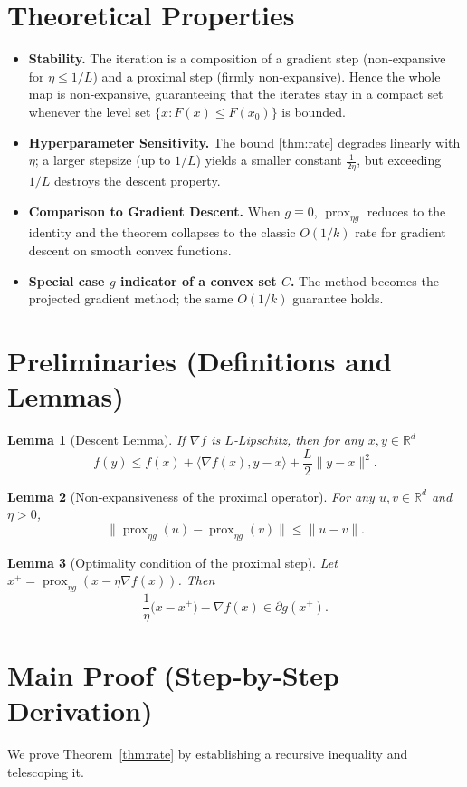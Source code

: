 \documentclass{article}
\newtheorem{lemma}{Lemma}
\newcommand{\prox}{\operatorname{prox}}
\newcommand{\R}{\mathbb{R}}
\begin{document}
\section*{Theoretical Properties}
\begin{itemize}
    \item \textbf{Stability.} The iteration is a composition of a gradient step (non‑expansive for $\eta\le 1/L$) and a proximal step (firmly non‑expansive). Hence the whole map is non‑expansive, guaranteeing that the iterates stay in a compact set whenever the level set $\{x:F(x)\le F(x_{0})\}$ is bounded.
    \item \textbf{Hyperparameter Sensitivity.} The bound \eqref{thm:rate} degrades linearly with $\eta$; a larger stepsize (up to $1/L$) yields a smaller constant $\frac{1}{2\eta}$, but exceeding $1/L$ destroys the descent property.
    \item \textbf{Comparison to Gradient Descent.} When $g\equiv0$, $\prox_{\eta g}$ reduces to the identity and the theorem collapses to the classic $O(1/k)$ rate for gradient descent on smooth convex functions.
    \item \textbf{Special case $g$ indicator of a convex set $C$.} The method becomes the projected gradient method; the same $O(1/k)$ guarantee holds.
\end{itemize}

\section*{Preliminaries (Definitions and Lemmas)}
\begin{lemma}[Descent Lemma]\label{lem:descent}
If $\nabla f$ is $L$‑Lipschitz, then for any $x,y\in\R^{d}$
\[
f(y)\le f(x)+\langle\nabla f(x),y-x\rangle+\frac{L}{2}\|y-x\|^{2}.
\]
\end{lemma}
\begin{lemma}[Non‑expansiveness of the proximal operator]\label{lem:nonexp}
For any $u,v\in\R^{d}$ and $\eta>0$,
\[
\bigl\|\prox_{\eta g}(u)-\prox_{\eta g}(v)\bigr\|\le\|u-v\|.
\]
\end{lemma}
\begin{lemma}[Optimality condition of the proximal step]\label{lem:optcond}
Let $x^{+}=\prox_{\eta g}(x-\eta\nabla f(x))$. Then
\[
\frac{1}{\eta}\bigl(x-x^{+}\bigr)-\nabla f(x)\in\partial g(x^{+}).
\]
\end{lemma}

\section*{Main Proof (Step‑by‑Step Derivation)}
We prove Theorem~\ref{thm:rate} by establishing a recursive inequality and telescoping it.
\end{document}
